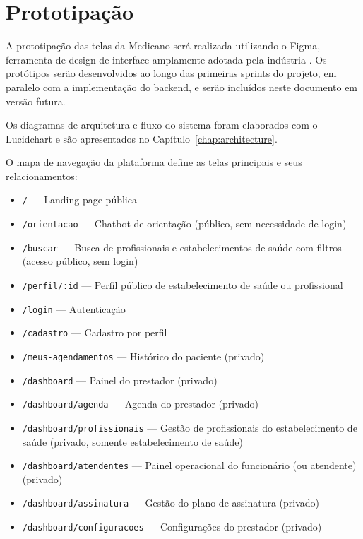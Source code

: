 \section{Prototipação}
\label{sec:prototyping}

A prototipação das telas da Medicano será realizada
utilizando o Figma, ferramenta de design de interface
amplamente adotada pela indústria \cite{figma2024}.
Os protótipos serão desenvolvidos ao longo das
primeiras sprints do projeto, em paralelo com a
implementação do backend, e serão incluídos neste
documento em versão futura.

Os diagramas de arquitetura e fluxo do sistema
foram elaborados com o Lucidchart e são apresentados
no Capítulo~\ref{chap:architecture}.

O mapa de navegação da plataforma define as telas
principais e seus relacionamentos:

\begin{itemize}
  \item \texttt{/} --- Landing page pública
  \item \texttt{/orientacao} --- Chatbot de orientação
        (público, sem necessidade de login)
  \item \texttt{/buscar} --- Busca de profissionais
        e estabelecimentos de saúde com filtros
        (acesso público, sem login)
  \item \texttt{/perfil/:id} --- Perfil público de
        estabelecimento de saúde ou profissional
  \item \texttt{/login} --- Autenticação
  \item \texttt{/cadastro} --- Cadastro por perfil
  \item \texttt{/meus-agendamentos} --- Histórico
        do paciente (privado)
  \item \texttt{/dashboard} --- Painel do prestador
        (privado)
  \item \texttt{/dashboard/agenda} --- Agenda do
        prestador (privado)
  \item \texttt{/dashboard/profissionais} --- Gestão
        de profissionais do estabelecimento de saúde (privado,
        somente estabelecimento de saúde)
  \item \texttt{/dashboard/atendentes} --- Painel
        operacional do funcionário (ou atendente)
        (privado)
  \item \texttt{/dashboard/assinatura} --- Gestão
        do plano de assinatura (privado)
  \item \texttt{/dashboard/configuracoes} ---
        Configurações do prestador (privado)
\end{itemize}